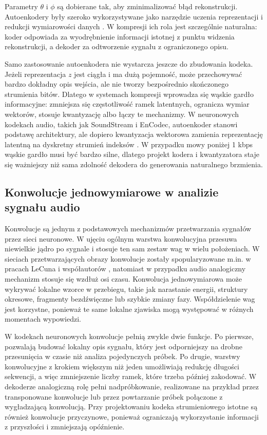 Parametry \(\theta\) i \(\phi\) są dobierane tak, aby zminimalizować błąd rekonstrukcji. Autoenkodery były szeroko wykorzystywane jako narzędzie uczenia reprezentacji i redukcji wymiarowości danych \cite{Hinton2006DimensionalityReduction,Goodfellow2016DeepLearning}. W kompresji ich rola jest szczególnie naturalna: koder odpowiada za wyodrębnienie informacji istotnej z punktu widzenia rekonstrukcji, a dekoder za odtworzenie sygnału z ograniczonego opisu.

Samo zastosowanie autoenkodera nie wystarcza jeszcze do zbudowania kodeka. Jeżeli reprezentacja \(z\) jest ciągła i ma dużą pojemność, może przechowywać bardzo dokładny opis wejścia, ale nie tworzy bezpośrednio skończonego strumienia bitów. Dlatego w systemach kompresji wprowadza się wąskie gardło informacyjne: zmniejsza się częstotliwość ramek latentnych, ogranicza wymiar wektorów, stosuje kwantyzację albo łączy te mechanizmy. W neuronowych kodekach audio, takich jak SoundStream i EnCodec, autoenkoder stanowi podstawę architektury, ale dopiero kwantyzacja wektorowa zamienia reprezentację latentną na dyskretny strumień indeksów \cite{Zeghidour2021SoundStream,Defossez2022Encodec}. W przypadku mowy poniżej 1 kbps wąskie gardło musi być bardzo silne, dlatego projekt kodera i kwantyzatora staje się ważniejszy niż sama zdolność dekodera do generowania naturalnego brzmienia.

\subsection{Konwolucje jednowymiarowe w analizie sygnału audio}
\label{subsec:konwolucje-jednowymiarowe-audio}

Konwolucje są jednym z podstawowych mechanizmów przetwarzania sygnałów przez sieci neuronowe. W ujęciu ogólnym warstwa konwolucyjna przesuwa niewielkie jądro po sygnale i stosuje ten sam zestaw wag w wielu położeniach. W sieciach przetwarzających obrazy konwolucje zostały spopularyzowane m.in. w pracach LeCuna i współautorów \cite{LeCun1998GradientBasedLearning}, natomiast w przypadku audio analogiczny mechanizm stosuje się wzdłuż osi czasu. Konwolucja jednowymiarowa może wykrywać lokalne wzorce w przebiegu, takie jak narastanie energii, struktury okresowe, fragmenty bezdźwięczne lub szybkie zmiany fazy. Współdzielenie wag jest korzystne, ponieważ te same lokalne zjawiska mogą występować w różnych momentach wypowiedzi.

W kodekach neuronowych konwolucje pełnią zwykle dwie funkcje. Po pierwsze, pozwalają budować lokalny opis sygnału, który jest odporniejszy na drobne przesunięcia w czasie niż analiza pojedynczych próbek. Po drugie, warstwy konwolucyjne z krokiem większym niż jeden umożliwiają redukcję długości sekwencji, a więc zmniejszenie liczby ramek, które trzeba później zakodować. W dekoderze analogiczną rolę pełni nadpróbkowanie, realizowane na przykład przez transponowane konwolucje lub przez powtarzanie próbek połączone z wygładzającą konwolucją. Przy projektowaniu kodeka strumieniowego istotne są również konwolucje przyczynowe, ponieważ ograniczają wykorzystanie informacji z przyszłości i zmniejszają opóźnienie.

